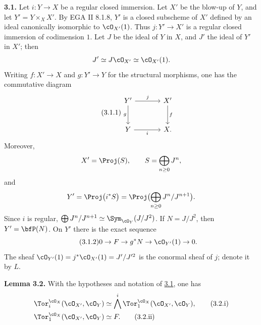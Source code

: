 \textbf{3.1.} Let \(i:Y\to X\) be a regular closed immersion. Let \(X'\) be the blow-up of \(Y\), and let \(Y'=Y\times_X X'\). By EGA II 8.1.8, \(Y'\) is a closed subscheme of \(X'\) defined by an ideal canonically isomorphic to \(\cO_{X'}(1)\). Thus \(j:Y'\to X'\) is a regular closed immersion of codimension \(1\). Let \(J\) be the ideal of \(Y\) in \(X\), and \(J'\) the ideal of \(Y'\) in \(X'\); then
\[
J'\simeq J\cO_{X'}\simeq\cO_{X'}(1).
\]
Writing \(f:X'\to X\) and \(g:Y'\to Y\) for the structural morphisms, one has the commutative diagram
\begin{equation}\tag{3.1.1}
\begin{tikzcd}[column sep=large,row sep=large]
Y' \arrow[r,"j"] \arrow[d,"g"'] & X' \arrow[d,"f"]\\
Y \arrow[r,"i"'] & X.
\end{tikzcd}
\end{equation}
Moreover,
\[
X'=\Proj(S),\qquad S=\bigoplus_{n\ge0}J^n,
\]
and
\[
Y'=\Proj\bigl(i^*S\bigr)
=\Proj\bigl(\bigoplus_{n\ge0}J^n/J^{n+1}\bigr).
\]
Since \(i\) is regular, \(\bigoplus J^n/J^{n+1}\simeq\Sym_{\cO_Y}(J/J^2)\). If \(N=J/J^2\), then \(Y'=\bfP(N)\). On \(Y'\) there is the exact sequence
\begin{equation}\tag{3.1.2}
0\to F\to g^*N\to\cO_{Y'}(1)\to0.
\end{equation}
The sheaf \(\cO_{Y'}(1)=j^*\cO_{X'}(1)=J'/J'^2\) is the conormal sheaf of \(j\); denote it by \(L\).

\textbf{Lemma 3.2.} With the hypotheses and notation of \hyperlink{sga6.e07.para.3-1}{3.1}, one has
\begin{align}
\Tor_i^{\cO_X}(\cO_{X'},\cO_Y)&\simeq
\bigwedge^i\Tor_1^{\cO_X}(\cO_{X'},\cO_Y),\tag{3.2.i}\\
\Tor_1^{\cO_X}(\cO_{X'},\cO_Y)&\simeq F.\tag{3.2.ii}
\end{align}

